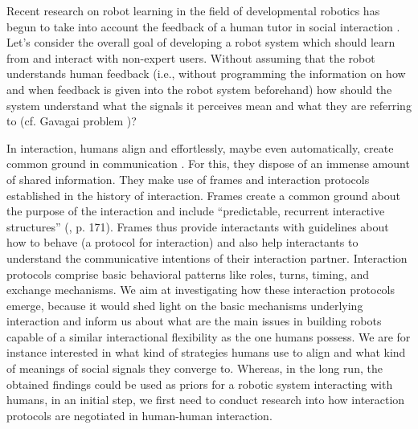 
Recent research on robot learning in the field of developmental robotics has begun to take into account the feedback of a human tutor in social interaction \cite{breazeal2004tutelage}. Let's consider the overall goal of developing a robot system which should learn from and interact with non-expert users. Without assuming that the robot understands human feedback (i.e., without programming the information on how and when feedback is given into the robot system beforehand) how should the system understand what the signals it perceives mean and what they are referring to (cf. Gavagai problem \cite{quine1964word})?

In interaction, humans align and effortlessly, maybe even automatically, create common ground in communication \cite{clark1991grounding,pickering2004toward}. For this, they dispose of an immense amount of shared information. They make use of frames and interaction protocols established in the history of interaction. Frames create a common ground about the purpose of the interaction \cite{tomasello2009cultural,rohlfing2013learning} and include ``predictable, recurrent interactive structures'' (\cite{ninio1996pragmatic}, p. 171). Frames thus provide interactants with guidelines about how to behave (a protocol for interaction) and also help interactants to understand the communicative intentions of their interaction partner. Interaction protocols comprise basic behavioral patterns like roles, turns, timing, and exchange mechanisms. We aim at investigating how these interaction protocols emerge, because it would shed light on the basic mechanisms underlying interaction and inform us about what are the main issues in building robots capable of a similar interactional flexibility as the one humans possess. We are for instance interested in what kind of strategies humans use to align and what kind of meanings of social signals they converge to. Whereas, in the long run, the obtained findings could be used as priors for a robotic system interacting with humans, in an initial step, we first need to conduct research into how interaction protocols are negotiated in human-human interaction.


